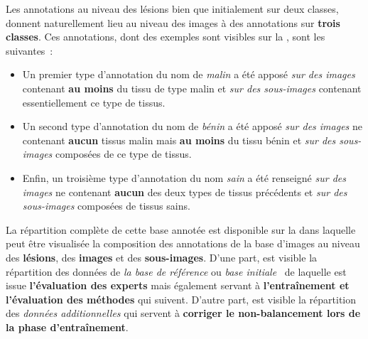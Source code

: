 Les annotations au niveau des lésions bien que initialement sur deux classes, donnent naturellement lieu au niveau des images à des annotations sur \textbf{trois classes}. Ces annotations, dont des exemples sont visibles sur la , sont les suivantes~:
\begin{itemize}
    \item Un premier type d'annotation du nom de \textit{malin} a été apposé \textit{sur des images} contenant \textbf{au moins} du tissu de type malin et \textit{sur des sous-images} contenant essentiellement ce type de tissus. 
    \item Un second type d'annotation du nom de \textit{bénin} a été apposé \textit{sur des images} ne contenant \textbf{aucun} tissus malin mais \textbf{au moins} du tissu bénin et \textit{sur des sous-images} composées de ce type de tissus. 
    \item  Enfin, un troisième type d'annotation du nom \textit{sain} a été renseigné \textit{sur des images} ne contenant \textbf{aucun} des deux types de tissus précédents et \textit{sur des sous-images} composées de tissus sains. 
\end{itemize}\par

La répartition complète de cette base annotée est disponible sur la  dans laquelle peut être visualisée la composition des annotations de la base d'images au niveau des \textbf{lésions}, des \textbf{images} et des \textbf{sous-images}. D'une part, est visible la répartition des données de \textit{la base de référence} ou \textit{base initiale}~\cite{Cinotti2018} de laquelle est issue \textbf{l'évaluation des experts} mais également servant à \textbf{l'entraînement et l'évaluation des méthodes} qui suivent. D'autre part, est visible la répartition des \textit{données additionnelles} qui servent à \textbf{corriger le non-balancement lors de la phase d'entraînement}.\par

